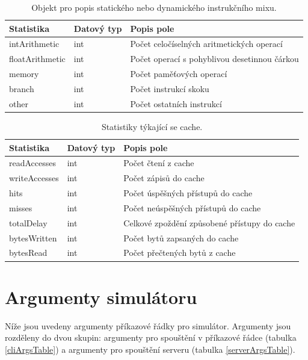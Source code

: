 \begin{table}[!ht]
    \centering
    \begin{tabular}{|l|l|l|}
    \hline
        Statistika & Datový typ & Popis pole \\ \hline\hline
        intArithmetic & int & Počet celočíselných aritmetických operací \\ 
        floatArithmetic & int & Počet operací s pohyblivou desetinnou čárkou \\ 
        memory & int & Počet paměťových operací \\ 
        branch & int & Počet instrukcí skoku \\ 
        other & int & Počet ostatních instrukcí \\ \hline
    \end{tabular}
    \caption{Objekt pro popis statického nebo dynamického instrukčního mixu.}
    \label{InstructionMixTable}
\end{table}

\begin{table}[!ht]
    \centering
    \begin{tabular}{|l|l|l|}
    \hline
        Statistika & Datový typ & Popis pole \\ \hline\hline
        readAccesses & int & Počet čtení z cache \\ 
        writeAccesses & int & Počet zápisů do cache \\ 
        hits & int & Počet úspěšných přístupů do cache \\ 
        misses & int & Počet neúspěšných přístupů do cache \\ 
        totalDelay & int & Celkové zpoždění způsobené přístupy do cache \\ 
        bytesWritten & int & Počet bytů zapsaných do cache \\ 
        bytesRead & int & Počet přečtených bytů z cache \\ \hline
    \end{tabular}
    \caption{Statistiky týkající se cache.}
    \label{CacheStatisticsTable}
\end{table}

\chapter{Argumenty simulátoru}
\label{simArgs}

Níže jsou uvedeny argumenty příkazové řádky pro simulátor.
Argumenty jsou rozděleny do dvou skupin: argumenty pro spouštění v příkazové řádce (tabulka \ref{cliArgsTable}) a argumenty pro spouštění serveru (tabulka \ref{serverArgsTable}).

